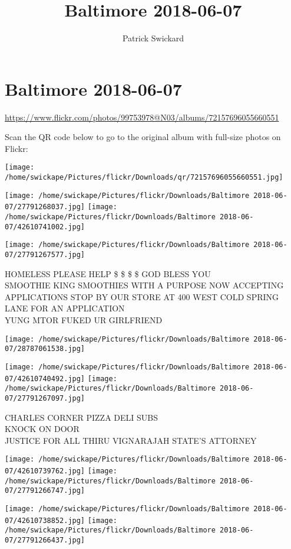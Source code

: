 \documentclass[10pt,letterpaper]{article}
\title{Baltimore 2018-06-07}
\author{Patrick Swickard}
\date{}
\begin{document}
\section*{Baltimore 2018-06-07}

\url{https://www.flickr.com/photos/99753978@N03/albums/72157696055660551}

Scan the QR code below to go to the original album with full-size photos on Flickr:

\texttt{[image: /home/swickape/Pictures/flickr/Downloads/qr/72157696055660551.jpg]}
\pagebreak

\texttt{[image: /home/swickape/Pictures/flickr/Downloads/Baltimore 2018-06-07/27791268037.jpg]}
\texttt{[image: /home/swickape/Pictures/flickr/Downloads/Baltimore 2018-06-07/42610741002.jpg]}

\texttt{[image: /home/swickape/Pictures/flickr/Downloads/Baltimore 2018-06-07/27791267577.jpg]}

HOMELESS PLEASE HELP \$ \$ \$ \$ GOD BLESS YOU\\
SMOOTHIE KING SMOOTHIES WITH A PURPOSE NOW ACCEPTING APPLICATIONS STOP BY OUR STORE AT 400 WEST COLD SPRING LANE FOR AN APPLICATION\\
YUNG MTOR FUKED UR GIRLFRIEND
\pagebreak

\texttt{[image: /home/swickape/Pictures/flickr/Downloads/Baltimore 2018-06-07/28787061538.jpg]}

\vspace{0.25in}
\texttt{[image: /home/swickape/Pictures/flickr/Downloads/Baltimore 2018-06-07/42610740492.jpg]}
\texttt{[image: /home/swickape/Pictures/flickr/Downloads/Baltimore 2018-06-07/27791267097.jpg]}

CHARLES CORNER PIZZA DELI SUBS\\
KNOCK ON DOOR\\
JUSTICE FOR ALL THIRU VIGNARAJAH STATE'S ATTORNEY
\pagebreak

\texttt{[image: /home/swickape/Pictures/flickr/Downloads/Baltimore 2018-06-07/42610739762.jpg]}
\texttt{[image: /home/swickape/Pictures/flickr/Downloads/Baltimore 2018-06-07/27791266747.jpg]}

\texttt{[image: /home/swickape/Pictures/flickr/Downloads/Baltimore 2018-06-07/42610738852.jpg]}
\texttt{[image: /home/swickape/Pictures/flickr/Downloads/Baltimore 2018-06-07/27791266437.jpg]}
\end{document}

